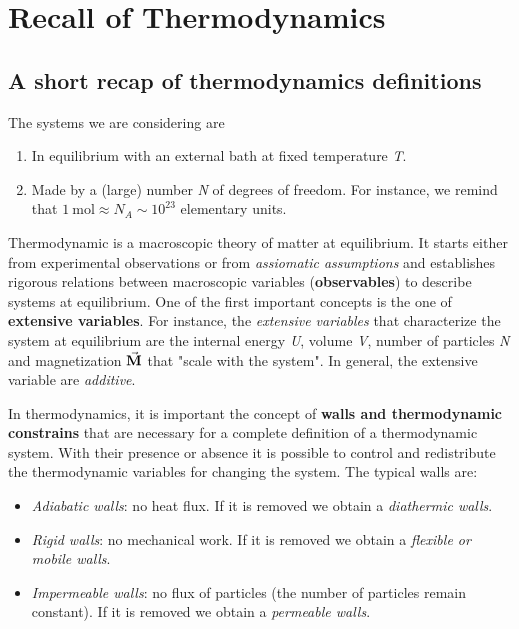 \documentclass[../../Main/Main.tex]{subfiles}
\begin{document}
\chapter{Recall of Thermodynamics}

\section{A short recap of thermodynamics definitions}
\noindent The systems we are considering are

\begin{enumerate}
\item In equilibrium with an external bath at fixed temperature \emph{T}.
\item Made by a (large) number \emph{N} of degrees of freedom. For instance, we remind that \( \SI{1}{\mole} \approx N_A \sim 10^{23}\) elementary units.
\end{enumerate}

\noindent Thermodynamic is a macroscopic theory of matter at equilibrium.
It starts either from experimental observations or from \emph{assiomatic assumptions} and establishes rigorous relations between macroscopic variables (\textbf{observables}) to describe systems at equilibrium.
One of the first important concepts is the one of \textbf{extensive variables}. For instance, the  \emph{extensive variables} that characterize the system at equilibrium are the internal energy \emph{U}, volume \emph{V}, number of particles \emph{N} and magnetization \( \va{M} \) that "scale with the system".
In general, the extensive variable are \emph{additive}.

In thermodynamics, it is important the concept of \textbf{walls and thermodynamic constrains} that are necessary for a complete definition of a thermodynamic system. With their presence or absence it is possible to control and redistribute the thermodynamic variables for changing the system.
The typical walls are:
\begin{itemize}
\item \textit{Adiabatic walls}: no heat flux. If it is removed we obtain a \textit{diathermic walls}.
\item \textit{Rigid walls}: no mechanical work. If it is removed we obtain a \textit{flexible or mobile walls}.
\item \textit{Impermeable walls}: no flux of particles (the number of particles remain constant). If it is removed we obtain a \textit{permeable walls}.
\end{itemize}
\end{document}
